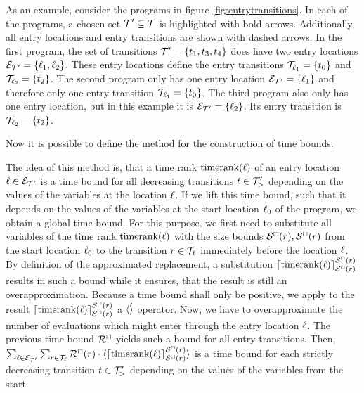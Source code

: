 

As an example, consider the programs in figure \ref{fig:entrytransitions}.
In each of the programs, a chosen set $\mathcal{T}' \subseteq \mathcal{T}$ is highlighted with bold arrows.
Additionally, all entry locations and entry transitions are shown with dashed arrows.
In the first program, the set of transitions $\mathcal{T}' = \lbrace t_1, t_3, t_4 \rbrace$ does have two entry locations $\mathcal{E}_{\mathcal{T}'} = \lbrace \ell_1, \ell_2 \rbrace$.
These entry locations define the entry transitions $\mathcal{T}_{\ell_1} = \lbrace t_0 \rbrace$ and $\mathcal{T}_{\ell_2} = \lbrace t_2 \rbrace$.
The second program only has one entry location $\mathcal{E}_{\mathcal{T}'} = \lbrace \ell_1 \rbrace$ and therefore only one entry transition $\mathcal{T}_{\ell_1} = \lbrace t_0 \rbrace$.
The third program also only has one entry location, but in this example it is $\mathcal{E}_{\mathcal{T}'} = \lbrace \ell_2 \rbrace$.
Its entry transition is $\mathcal{T}_{\ell_2} = \lbrace t_2 \rbrace$.

Now it is possible to define the method for the construction of time bounds.



The idea of this method is, that a time rank $\text{timerank}(\ell)$ of an entry location $\ell \in \mathcal{E}_{\mathcal{T}'}$ is a time bound for all decreasing transitions $t \in \mathcal{T}'_>$ depending on the values of the variables at the location $\ell$.
If we lift this time bound, such that it depends on the values of the variables at the start location $\ell_0$ of the program, we obtain a global time bound.
For this purpose, we first need to substitute all variables of the time rank $\text{timerank}(\ell)$ with the size bounds ${\mathcal{S}^\sqcap}(r), {\mathcal{S}^\sqcup}(r)$ from the start location $\ell_0$ to the transition $r \in \mathcal{T}_{\ell}$ immediately before the location $\ell$.
By definition of the approximated replacement, a substitution $\lceil \text{timerank}(\ell) \rceil^{{\mathcal{S}^\sqcap}(r)}_{{\mathcal{S}^\sqcup}(r)}$ results in such a bound while it ensures, that the result is still an overapproximation. 
Because a time bound shall only be positive, we apply to the result $\lceil \text{timerank}(\ell) \rceil^{{\mathcal{S}^\sqcap}(r)}_{{\mathcal{S}^\sqcup}(r)}$ a $\langle\dot\rangle$ operator.
Now, we have to overapproximate the number of evaluations which might enter through the entry location $\ell$.
The previous time bound ${\mathcal{R}^\sqcap}$ yields such a bound for all entry transitions.
Then, $\sum_{\ell \in \mathcal{E}_{\mathcal{T}'}} \sum_{r \in \mathcal{T}_\ell} {\mathcal{R}^\sqcap}(r) \cdot \langle\lceil \text{timerank}(\ell) \rceil^{{\mathcal{S}^\sqcap}(r)}_{{\mathcal{S}^\sqcup}(r)}\rangle$ is a time bound for each strictly decreasing transition $t \in \mathcal{T}'_>$ depending on the values of the variables from the start.

